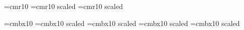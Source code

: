 \font\fwfontnorm=cmr10
\font\fwfontnorma=cmr10 scaled 
\font\fwfontnormb=cmr10 scaled 

\font\fwfontbold=cmbx10
\font\fwfontbolda=cmbx10 scaled 
\font\fwfontboldb=cmbx10 scaled 
\font\fwfontboldc=cmbx10 scaled 
\font\fwfontboldd=cmbx10 scaled 



\def\fwbeginmacro{\fwparskipoff\bigskip}
\def\fwendmacro{\fwparskipon\par}

\def\fwmacroname#1#2{{\sl #1\/}$\lbrack$#2$\rbrack$}
\def\fwfilename#1#2{{\bf #1}$\lbrack$#2$\rbrack$}
\def\fwzero#1{{\bf Z}}
\def\fwmany#1{{\bf M}}
\def\fwlib#1{{\bf L}}
\def\fwequals{ $\equiv$}
\def\fwplusequals{ $+\equiv$}

\def\fwodef{\parindent=15pt\vskip0pt$\lbrace$\parindent=20pt}
\def\fwcdef{$\rbrace$\vskip0pt\parindent=0pt}
\def\fwoquote{`}
\def\fwcquote{'}
\def\fwoparen{$($}
\def\fwcomma{$,$}
\def\fwcparen{$)$}
\def\fwparam#1{$\diamond #1$}
\def\fwparams#1{$(\diamond #1)$}

\def\fwbeginmacronotes{\begingroup\baselineskip=9pt\smallskip}
\def\fwnote#1{{\fwfontnote #1}\par}
\def\fwisafile#1{\fwnote{#1}}
\def\fwusedin#1{\fwnote{#1}}
\def\fwseealso#1{\fwnote{#1}}
\def\fwendmacronotes{\endgroup}




